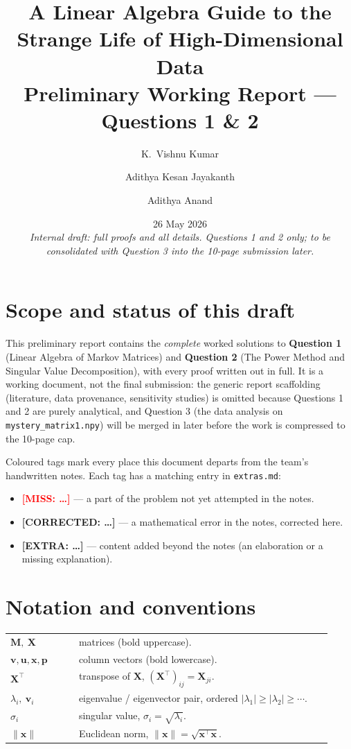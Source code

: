 \documentclass[12pt,a4paper]{article}
\title{\vspace{-1.6cm}\Huge\bfseries A Linear Algebra Guide to the\\Strange Life of High-Dimensional Data\\[0.4em]
\Large Preliminary Working Report --- Questions 1 \& 2}
\author{K.\ Vishnu Kumar \and Adithya Kesan Jayakanth \and Adithya Anand}
\date{26 May 2026\\[0.3em]\small\itshape Internal draft: full proofs and all details.
Questions 1 and 2 only; to be consolidated with Question 3 into the 10-page submission later.}
\newcommand{\miss}[1]{{\textbf{\textcolor{red}{[MISS: #1]}}}}
\newcommand{\fix}[1]{{\textbf{\textcolor{orange!85!black}{[CORRECTED: #1]}}}}
\newcommand{\extra}[1]{{\textbf{\textcolor{blue!80!black}{[EXTRA: #1]}}}}
\theoremstyle{definition}
\newcommand{\Mx}{\mathbf{M}}
\newcommand{\Xb}{\mathbf{X}}
\newcommand{\vv}{\mathbf{v}}
\newcommand{\uu}{\mathbf{u}}
\newcommand{\xx}{\mathbf{x}}
\newcommand{\pp}{\mathbf{p}}
\newcommand{\norm}[1]{\lVert #1 \rVert}
\newcommand{\T}{^{\!\top}}
\begin{document}
\maketitle
\thispagestyle{fancy}

\section*{Scope and status of this draft}

This preliminary report contains the \emph{complete} worked solutions to
\textbf{Question 1} (Linear Algebra of Markov Matrices) and \textbf{Question 2}
(The Power Method and Singular Value Decomposition), with every proof written
out in full. It is a working document, not the final submission: the
generic report scaffolding (literature, data provenance, sensitivity studies)
is omitted because Questions 1 and 2 are purely analytical, and Question 3
(the data analysis on \texttt{mystery\_matrix1.npy}) will be merged in later
before the work is compressed to the 10-page cap.

Coloured tags mark every place this document departs from the team's
handwritten notes. Each tag has a matching entry in \texttt{extras.md}:
\begin{itemize}[leftmargin=1.4em, itemsep=1pt]
  \item \miss{\dots} --- a part of the problem not yet attempted in the notes.
  \item \fix{\dots} --- a mathematical error in the notes, corrected here.
  \item \extra{\dots} --- content added beyond the notes (an elaboration or a missing explanation).
\end{itemize}

\section*{Notation and conventions}

\begin{tabular}{@{}p{0.20\linewidth}p{0.74\linewidth}@{}}
$\Mx,\ \Xb$ & matrices (bold uppercase). \\
$\vv,\uu,\xx,\pp$ & column vectors (bold lowercase). \\
$\Xb\T$ & transpose of $\Xb$, $(\Xb\T)_{ij}=\Xb_{ji}$. \\
$\lambda_i,\ \vv_i$ & eigenvalue / eigenvector pair, ordered $|\lambda_1|\ge|\lambda_2|\ge\cdots$. \\
$\sigma_i$ & singular value, $\sigma_i=\sqrt{\lambda_i}$. \\
$\norm{\xx}$ & Euclidean norm, $\norm{\xx}=\sqrt{\xx\T\xx}$. \\
\end{tabular}
\end{document}
